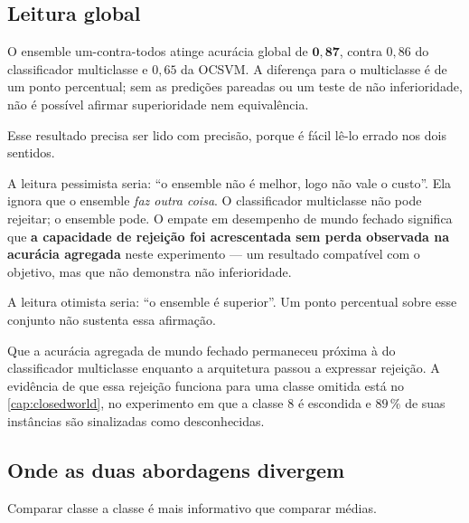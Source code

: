 \subsection{Leitura global}

\begin{resultadochave}
O ensemble um-contra-todos atinge acurácia global de $\bm{0{,}87}$, contra $0{,}86$ do
classificador multiclasse e $0{,}65$ da OCSVM. A diferença para o multiclasse é de um
ponto percentual; sem as predições pareadas ou um teste de não inferioridade, não é
possível afirmar superioridade nem equivalência.
\end{resultadochave}

Esse resultado precisa ser lido com precisão, porque é fácil lê-lo errado nos dois
sentidos.

A leitura pessimista seria: ``o ensemble não é melhor, logo não vale o custo''. Ela
ignora que o ensemble \emph{faz outra coisa}. O classificador multiclasse não pode
rejeitar; o ensemble pode. O empate em desempenho de mundo fechado significa que
\textbf{a capacidade de rejeição foi acrescentada sem perda observada na acurácia
agregada} neste experimento --- um resultado compatível com o objetivo, mas que não
demonstra não inferioridade.

A leitura otimista seria: ``o ensemble é superior''. Um ponto percentual sobre esse
conjunto não sustenta essa afirmação.

\begin{destaque}
Que a acurácia agregada de mundo fechado permaneceu próxima à do classificador
multiclasse enquanto a arquitetura passou a expressar rejeição. A evidência de que essa
rejeição funciona para uma classe omitida está no \cref{cap:closedworld}, no experimento
em que a classe 8 é escondida e $89\,\%$ de suas instâncias são sinalizadas como
desconhecidas.
\end{destaque}

\subsection{Onde as duas abordagens divergem}

Comparar classe a classe é mais informativo que comparar médias.

